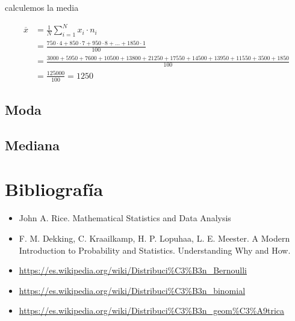 \documentclass[
]{article}
\providecommand{\tightlist}{%
  \setlength{\itemsep}{0pt}\setlength{\parskip}{0pt}}
\begin{document}
calculemos la media

\begin{align*}
\overline x &= \frac{1}{N}\sum^{N}_{i=1} x_i  \cdot n_i\\
&= \frac{750  \cdot  4 + 850  \cdot  7 + 950 \cdot 8 +  \ldots + 1850 \cdot  1}{100}\\
& = \frac{3000  + 5950  + 7600  + 10500 + 13800 + 21250 + 17550 + 14500 + 13950 + 11550 + 3500  + 1850}{100}\\
&=\frac{125000}{100}=1250
\end{align*}

\hypertarget{moda}{%
\subsection{Moda}\label{moda}}

\hypertarget{mediana}{%
\subsection{Mediana}\label{mediana}}

\hypertarget{bibliografuxeda}{%
\section{Bibliografía}\label{bibliografuxeda}}

\begin{itemize}
\tightlist
\item
  John A. Rice. Mathematical Statistics and Data Analysis
\item
  F. M. Dekking, C. Kraailkamp, H. P. Lopuhaa, L. E. Meester. A Modern
  Introduction to Probability and Statistics. Understanding Why and How.
\item
  \url{https://es.wikipedia.org/wiki/Distribuci\%C3\%B3n_Bernoulli}
\item
  \url{https://es.wikipedia.org/wiki/Distribuci\%C3\%B3n_binomial}
\item
  \url{https://es.wikipedia.org/wiki/Distribuci\%C3\%B3n_geom\%C3\%A9trica}
\end{itemize}
\end{document}
